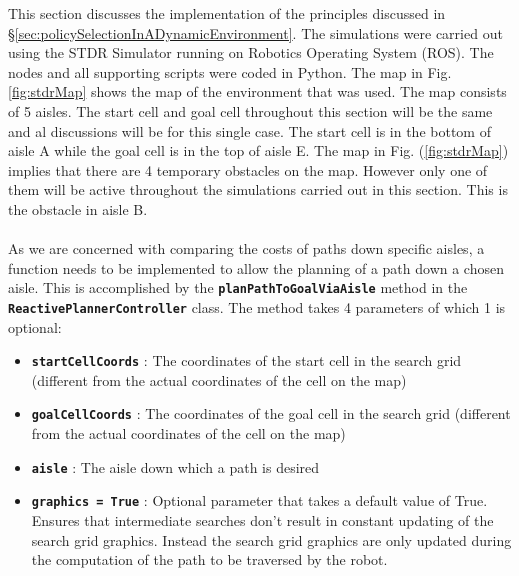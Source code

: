 \documentclass[a4paper,12pt]{article}
\begin{document}
		This section discusses the implementation of the principles discussed in \S \ref{sec:policySelectionInADynamicEnvironment}. The simulations were carried out using the STDR Simulator running on Robotics Operating System (ROS). The nodes and all supporting scripts were coded in Python. The map in Fig. \ref{fig:stdrMap} shows the map of the environment that was used. The map consists of 5 aisles. The start cell and goal cell throughout this section will be the same and al discussions will be for this single case. The start cell is in the bottom of aisle A while the goal cell is in the top of aisle E. The map in Fig. (\ref{fig:stdrMap}) implies that there are 4 temporary obstacles on the map. However only one of them will be active throughout the simulations carried out in this section. This is the obstacle in aisle B.
		\\
		\\
		As we are concerned with comparing the costs of paths down specific aisles, a function needs to be implemented to allow the planning of a path down a chosen aisle. This is accomplished by the \texttt{\textbf{planPathToGoalViaAisle}} method in the \texttt{\textbf{ReactivePlannerController}} class. The method takes 4 parameters of which 1 is optional:
		\begin{itemize}
			\item \textbf{\texttt{startCellCoords}} : The coordinates of the start cell in the search grid (different from the actual coordinates of the cell on the map)
			\item \textbf{\texttt{goalCellCoords}} : The coordinates of the goal cell in the search grid (different from the actual coordinates of the cell on the map)
			\item \textbf{\texttt{aisle}} : The aisle down which a path is desired
			\item \textbf{\texttt{graphics = True}} : Optional parameter that takes a default value of True. Ensures that intermediate searches don't result in constant updating of the search grid graphics. Instead the search grid graphics are only updated during the computation of the path to be traversed by the robot. 
		\end{itemize} 
		
\end{document}
